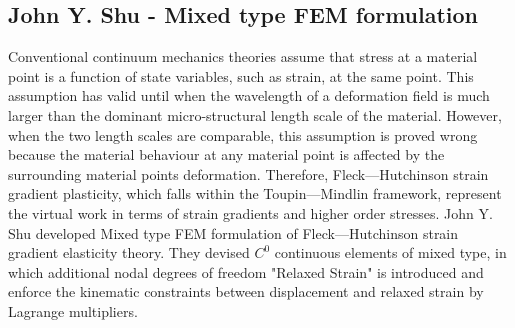 \documentclass[12pt]{article}
\begin{document}
\subsection{John Y. Shu - Mixed type FEM formulation}
\vspace{0.4cm}
Conventional continuum mechanics theories assume that stress at a material point is a function
of state variables, such as strain, at the same point. This assumption has valid until when the wavelength of a deformation field is much larger than the dominant micro-structural length scale of the material. However, when the two length scales are comparable, this assumption is proved wrong because the material behaviour at any material point is affected by the surrounding material points deformation. Therefore, Fleck—Hutchinson strain gradient plasticity, which falls within the Toupin—Mindlin framework, represent the virtual work in terms of strain gradients and higher order stresses.
\newline
\newline
John Y. Shu \cite{shu1999finite} developed Mixed type FEM formulation of Fleck—Hutchinson strain gradient elasticity theory. They devised $C^0$ continuous elements of mixed type, in which additional nodal degrees of freedom "Relaxed Strain" is introduced and enforce the kinematic constraints between displacement and relaxed strain by Lagrange multipliers.
\newline
\end{document}
